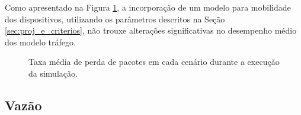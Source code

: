 \documentclass[12pt]{article}
\begin{document}
Como apresentado na Figura \ref{fig:lostPackets_CBR_pulse}, a incorporação de um modelo para mobilidade dos dispositivos, utilizando os parâmetros descritos na Seção \ref{sec:proj_e_criterios}, não trouxe alterações significativas no desempenho médio dos modelo tráfego.

\begin{figure}[H]
\begin{center}
{%
\setlength{\fboxsep}{2pt}%
\setlength{\fboxrule}{1pt}%
%
}
\end{center}
\caption{Taxa média de perda de pacotes em cada cenário durante a execução da simulação.}
\label{fig:lostPackets_CBR_pulse}
\end{figure}



\subsection{Vazão}\label{subsec:vazao}
\end{document}
